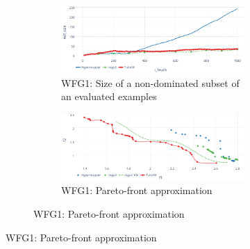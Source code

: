     \begin{figure}
        \centering
        \begin{subfigure}{\textwidth}
            \begin{subfigure}{0.5\textwidth}
                \includegraphics[width=\textwidth]{content/images/wfg1_ndf}
                \caption{WFG1: Size of a non-dominated subset of an evaluated examples}
                \label{fig:wfg1_ndf}
            \end{subfigure} 
            \begin{subfigure}{0.5\textwidth}
                \includegraphics[width=\textwidth]{content/images/wfg1_front}
                \caption{WFG1: Pareto-front approximation}
                \label{fig:wfg1_front}
            \end{subfigure} 
        \end{subfigure} 

        



\end{figure}
